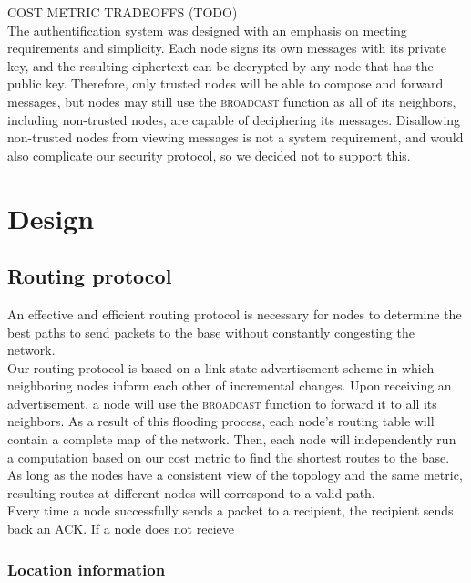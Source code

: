 \documentclass[letterpaper]{article}
\begin{document}
\noindent COST METRIC TRADEOFFS (TODO)
\\

\noindent The authentification system was designed with an emphasis on meeting requirements and simplicity.
Each node signs its own messages with its private key, and the resulting ciphertext can be decrypted by any
node that has the public key. Therefore, only trusted nodes will be able to compose and forward messages, but
nodes may still use the \textsc{broadcast} function as all of its neighbors, including non-trusted nodes, are
capable of deciphering its messages. Disallowing non-trusted nodes from viewing messages is not a system 
requirement, and would also complicate our security protocol, so we decided not to support this.

\section{Design}

\subsection{Routing protocol}

An effective and efficient routing protocol is necessary for nodes to determine the best paths to send
packets to the base without constantly congesting the network.
\\

\noindent Our routing protocol is based on a link-state advertisement scheme in which neighboring nodes 
inform each other of incremental changes. Upon receiving an advertisement, a node will use the 
\textsc{broadcast} function to forward it to all its neighbors. As a result of this flooding process,
each node's routing table will contain a complete map of the network. Then, each node will independently
run a computation based on our cost metric to find the shortest routes to the base. As long as the nodes
have a consistent view of the topology and the same metric, resulting routes at different nodes will
correspond to a valid path.
\\

\noindent Every time a node successfully sends a packet to a recipient, the recipient sends back an ACK.
If a node does not recieve

\subsubsection{Location information}
\end{document}
